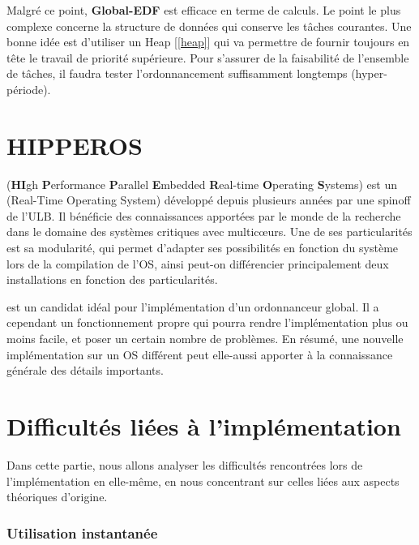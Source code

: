 	
	Malgré ce point, \textbf{Global-EDF} est \og{}efficace\fg{} en terme de calculs.
	Le point le plus complexe concerne la structure de données qui conserve les 
	tâches courantes. Une bonne idée est d'utiliser un Heap [\ref*{heap}] qui 
	va permettre de fournir toujours en tête le travail de priorité supérieure.
	Pour s'assurer de la faisabilité de l'ensemble de tâches, 
	il faudra tester l'ordonnancement suffisamment longtemps (hyper-période).\newline
		
\section{HIPPEROS}
	 (\textbf{HI}gh \textbf{P}erformance \textbf{P}arallel \textbf{E}mbedded \textbf{R}eal-time \textbf{O}perating \textbf{S}ystems)
	est un  (Real-Time Operating System) développé depuis plusieurs années par une spinoff de l'ULB.
	Il bénéficie des connaissances apportées par le monde de la recherche dans 
	le domaine des systèmes critiques avec multic\oe{}urs. Une de ses particularités 
	est sa modularité, qui permet d'adapter ses possibilités en fonction du système 
	lors de la compilation de l'OS, ainsi peut-on différencier principalement 
	deux installations en fonction des particularités. 
	
	 est un candidat idéal pour l'implémentation d'un ordonnanceur 
	global. Il a cependant un fonctionnement propre qui pourra rendre l'implémentation 
	plus ou moins facile, et poser un certain nombre de problèmes. 
	En résumé, une nouvelle implémentation sur un OS différent 
	peut elle-aussi apporter à la connaissance générale des détails importants.
		

\section{Difficultés liées à l'implémentation}

	Dans cette partie, nous allons analyser les difficultés rencontrées lors de l'implémentation en elle-même, 
	en nous concentrant sur celles liées aux aspects théoriques d'origine. 

	\subsubsection{Utilisation instantanée}
	
